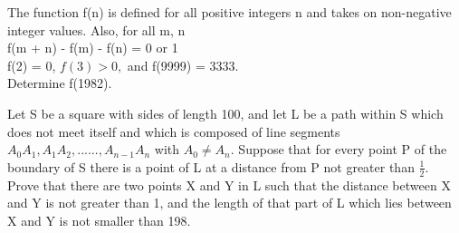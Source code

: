 \item The function f(n) is defined for all positive integers n and takes on non-negative integer values. Also, for all m, n\\
f(m + n) - f(m) - f(n) = 0 or 1\\
f(2) = 0, $f(3) > 0,$ and f(9999) = 3333.\\
Determine f(1982).

\item Let S be a square with sides of length 100, and let L be a path within S which does not meet itself and which is composed of line segments $A_0A_1, A_1A_2,......, A_{n - 1}A_n$ with $A_0 \neq A_n.$ Suppose that for every point P of the boundary of S there is a point of L at a distance from P not greater than $\frac{1}{2}.$ Prove that there are two points X and Y in L such that the distance between X and Y is not greater than 1, and the length of that part of L which lies between X and Y is not smaller than 198.


